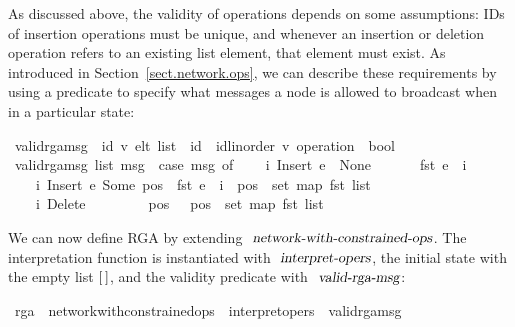 As discussed above, the validity of operations depends on some assumptions: IDs of insertion operations must be unique, and whenever an insertion or deletion operation refers to an existing list element, that element must exist.
As introduced in Section~\ref{sect.network.ops}, we can describe these requirements by using a predicate to specify what messages a node is allowed to broadcast when in a particular state:
\begin{isabelle}
\ valid{\isacharunderscore}rga{\isacharunderscore}msg\ {\isacharcolon}{\isacharcolon}\ {\isachardoublequoteopen}{\isacharparenleft}{\isacharprime}id{\isacharcomma}\ {\isacharprime}v{\isacharparenright}\ elt\ list\ {\isasymRightarrow}\ {\isacharprime}id\ {\isasymtimes}\ {\isacharparenleft}{\isacharprime}id{\isacharcolon}{\isacharcolon}linorder{\isacharcomma}\ {\isacharprime}v{\isacharparenright}\ operation\ {\isasymRightarrow}\ bool{\isachardoublequoteclose}\ \isanewline
\ {\isachardoublequoteopen}valid{\isacharunderscore}rga{\isacharunderscore}msg\ list\ msg\ {\isasymequiv}\ case\ msg\ of\isanewline
\ \ \ \ {\isacharparenleft}i{\isacharcomma}\ Insert\ e\ \ None\ \ \ \ \ {\isacharparenright}\ {\isasymRightarrow}\ fst\ e\ {\isacharequal}\ i\ {\isacharbar}\isanewline
\ \ \ \ {\isacharparenleft}i{\isacharcomma}\ Insert\ e\ {\isacharparenleft}Some\ pos{\isacharparenright}{\isacharparenright}\ {\isasymRightarrow}\ fst\ e\ {\isacharequal}\ i\ {\isasymand}\ pos\ {\isasymin}\ set\ {\isacharparenleft}map\ fst\ list{\isacharparenright}\ {\isacharbar}\isanewline
\ \ \ \ {\isacharparenleft}i{\isacharcomma}\ Delete\ \ \ \ \ \ \ \ \ pos\ {\isacharparenright}\ {\isasymRightarrow}\ pos\ {\isasymin}\ set\ {\isacharparenleft}map\ fst\ list{\isacharparenright}{\isachardoublequoteclose}
\end{isabelle}
We can now define RGA by extending $\isa{network-with-constrained-ops}$. The interpretation function is instantiated with $\isa{interpret-opers}$, the initial state with the empty list $\emph{$[$}\,\emph{$]$}$, and the validity predicate with $\isa{valid-rga-msg}$:
\begin{isabelle}
\ rga\ {\isacharequal}\ network{\isacharunderscore}with{\isacharunderscore}constrained{\isacharunderscore}ops\ {\isacharunderscore}\ interpret{\isacharunderscore}opers\ {\isachardoublequoteopen}{\isacharbrackleft}{\isacharbrackright}{\isachardoublequoteclose}\ valid{\isacharunderscore}rga{\isacharunderscore}msg
\end{isabelle}

